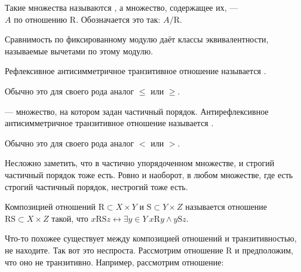 \documentclass{article}
\begin{document}
\begin{itemize}
        \dfn Такие множества называются , а множество, содержащее их, ---\\ $A$ по отношению $\mathrm R$. Обозначается это так: $A/{\mathrm R}$.
        \begin{Example}
            Сравнимость по фиксированному модулю даёт классы эквивалентности, называемые вычетами по этому модулю.
        \end{Example}
        \dfn Рефлексивное антисимметричное транзитивное отношение называется .
        \begin{Example}
            Обычно это для своего рода аналог $\leqslant$ или $\geqslant$.
        \end{Example}
        \dfn {} --- множество, на котором задан частичный порядок.
        \dfn Антирефлексивное антисимметричное транзитивное отношение называется .
        \begin{Example}
            Обычно это для своего рода аналог $<$ или $>$.
        \end{Example}
        \begin{Comment}
            Несложно заметить, что в частично упорядоченном множестве, и строгий частичный порядок тоже есть. Ровно и наоборот, в любом множестве, где есть строгий частичный порядок, нестрогий тоже есть.
        \end{Comment}
        \dfn Композицией отношений $\mathrm R\subset X\times Y$ и $\mathrm S\subset Y\times Z$ называется отношение $\mathrm R\mathrm S\subset X\times Z$ такой, что $x\mathrm R\mathrm Sz\leftrightarrow\exists y\in Y~x\mathrm Ry\land y\mathrm Sz$.
        \begin{Comment}
            Что-то похожее существует между композицией отношений и транзитивностью, не находите. Так вот это неспроста. Рассмотрим отношение $\mathrm R$ и предположим, что оно не транзитивно. Например, рассмотрим отношение:\\
\end{Comment}
\end{itemize}
\end{document}
